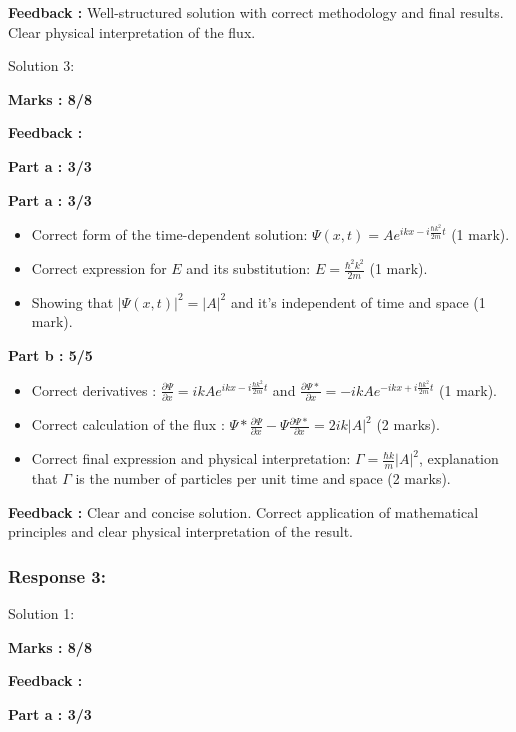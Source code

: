 \documentclass[a4paper,11pt]{article}
\begin{document}
\textbf{Feedback :}
Well-structured solution with correct methodology and final results. Clear physical interpretation of the flux.


Solution 3:

\textbf{Marks : 8/8}

\textbf{Feedback : }

\textbf{Part a : 3/3}

\textbf{Part a : 3/3}

\begin{itemize}
    \item Correct form of the time-dependent solution: $\Psi(x,t) = Ae^{ikx-i\frac{\hbar k^2}{2m}t}$ (1 mark).
    \item Correct expression for $E$ and its substitution: $E = \frac{\hbar^2 k^2}{2m}$ (1 mark).
    \item Showing that $|\Psi(x,t)|^2 = |A|^2$ and it's independent of time and space (1 mark).
\end{itemize}


\textbf{Part b : 5/5}

\begin{itemize}
    \item Correct derivatives : $\frac{\partial \Psi}{\partial x} = ikAe^{ikx-i\frac{\hbar k^2}{2m}t}$ and $\frac{\partial \Psi*}{\partial x} = -ikAe^{-ikx+i\frac{\hbar k^2}{2m}t}$ (1 mark).
    \item Correct calculation of the flux : $\Psi* \frac{\partial\Psi}{\partial x} - \Psi \frac{\partial\Psi*}{\partial x} = 2ik|A|^2$ (2 marks).
    \item Correct final expression and physical interpretation: $\Gamma = \frac{\hbar k }{m} |A|^2$, explanation that $\Gamma$ is the number of particles per unit time and space (2 marks).
\end{itemize}


\textbf{Feedback :}
Clear and concise solution. Correct application of mathematical principles and clear physical interpretation of the result.



\subsubsection*{Response 3:}

Solution 1:

\textbf{Marks : 8/8}

\textbf{Feedback : }

\textbf{Part a : 3/3}
\end{document}
